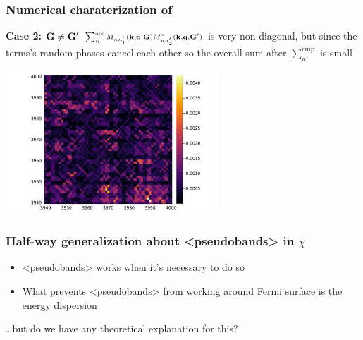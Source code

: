\documentclass[t,aspectratio=169]{beamer}
\newcommand{\shortcode}[1]{\texttt{#1}}
\def\texttt#1{<#1>}%
\begin{document}
\begin{frame}[allowframebreaks]
\frametitle{Numerical charaterization of }


\textbf{Case 2: $\vb{G} \neq \vb{G}'$} $\scriptstyle \sum_{n}^{\text{occ}} M_{n n'_1} (\vb{k}, \vb{q}, \vb{G}) M^*_{nn'_2} (\vb{k}, \vb{q}, \vb{G}')$ is very non-diagonal, 
but since the terms's random phases cancel each other so the overall sum after $\sum_{n'}^{\text{emp}}$ is small

\begin{center}
    \includegraphics[width=0.6\textwidth]{../data/chi/nc_range-3939-4000-k_idx-2-q_idx-3-G1_idx-2000-G2_idx-2001.png}
\end{center}


\end{frame}

\begin{frame}
\frametitle{Half-way generalization about \shortcode{pseudobands} in $\chi$}

\begin{itemize}
    \item[\faHandPointRight] \shortcode{pseudobands} works  
    when it's necessary to do so 
    \item[\faHandPointRight] What prevents \shortcode{pseudobands} from working 
    around Fermi surface is the energy dispersion
\end{itemize}

\vspace{0.5cm}

\dots but do we have any theoretical explanation for this?

\end{frame}
\end{document}
